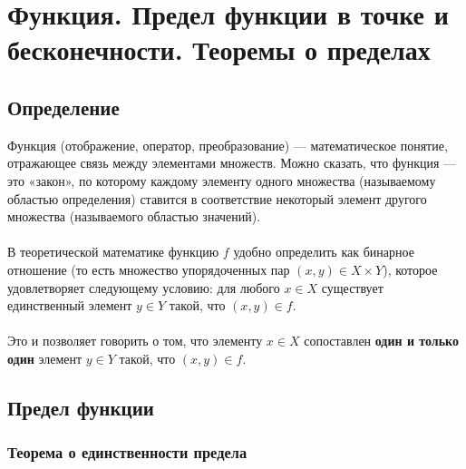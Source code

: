 \section{Функция. Предел функции в точке и бесконечности. Теоремы о пределах}

\subsection{Определение}

Функция (отображение, оператор, преобразование) — математическое понятие, отражающее связь между элементами множеств. Можно сказать, что функция — это «закон», по которому каждому элементу одного множества (называемому областью определения) ставится в соответствие некоторый элемент другого множества (называемого областью значений).
\\\\
В теоретической математике функцию $f$ удобно определить как бинарное отношение (то есть множество упорядоченных пар $(x,y)\in X\times Y$), которое удовлетворяет следующему условию: для любого $x\in X$ существует единственный элемент $y\in Y$ такой, что $(x,y)\in f$.
\\\\
Это и позволяет говорить о том, что элементу $x\in X$ сопоставлен \textbf{один и только один} элемент $y\in Y$ такой, что $(x,y)\in f$.

\subsection{Предел функции}

\subsubsection{Теорема о единственности предела}
